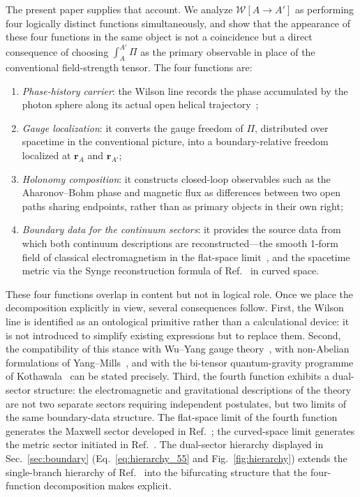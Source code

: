 \documentclass[%
 reprint, amsmath,amssymb, aps, prb, ]{revtex4-2}
\numberwithin{equation}{section}
\newcommand{\WL}{\mathcal{W}}
\begin{document}
The present paper supplies that account. We analyze $\WL[A\to A']$ as performing four logically distinct functions simultaneously, and show that the appearance of these four functions in the same object is not a coincidence but a direct consequence of choosing $\int_A^{A'}\Pi$ as the primary observable in place of the conventional field-strength tensor. The four functions are:
\begin{enumerate}
\item \textit{Phase-history carrier}: the Wilson line records the phase accumulated by the photon sphere along its actual open helical trajectory~\cite{hanamura51};
\item \textit{Gauge localization}: it converts the gauge freedom of $\Pi$, distributed over spacetime in the conventional picture, into a boundary-relative freedom localized at $\mathbf{r}_A$ and $\mathbf{r}_{A'}$;
\item \textit{Holonomy composition}: it constructs closed-loop observables such as the Aharonov--Bohm phase and magnetic flux as differences between two open paths sharing endpoints, rather than as primary objects in their own right;
\item \textit{Boundary data for the continuum sectors}: it provides the source data from which both continuum descriptions are reconstructed---the smooth 1-form field of classical electromagnetism in the flat-space limit~\cite{hanamura54}, and the spacetime metric via the Synge reconstruction formula of Ref.~\cite{hanamura51} in curved space.
\end{enumerate}
These four functions overlap in content but not in logical role. Once we place the decomposition explicitly in view, several consequences follow. First, the Wilson line is identified as an ontological primitive rather than a calculational device: it is not introduced to simplify existing expressions but to replace them. Second, the compatibility of this stance with Wu--Yang gauge theory~\cite{WuYang1975}, with non-Abelian formulations of Yang--Mills~\cite{YangMills1954}, and with the bi-tensor quantum-gravity programme of Kothawala~\cite{Kothawala2023} can be stated precisely. Third, the fourth function exhibits a dual-sector structure: the electromagnetic and gravitational descriptions of the theory are not two separate sectors requiring independent postulates, but two limits of the same boundary-data structure. The flat-space limit of the fourth function generates the Maxwell sector developed in Ref.~\cite{hanamura54}; the curved-space limit generates the metric sector initiated in Ref.~\cite{hanamura51}. The dual-sector hierarchy displayed in Sec.~\ref{sec:boundary} (Eq.~\eqref{eq:hierarchy_55} and Fig.~\ref{fig:hierarchy}) extends the single-branch hierarchy of Ref.~\cite{hanamura54} into the bifurcating structure that the four-function decomposition makes explicit.
\end{document}
